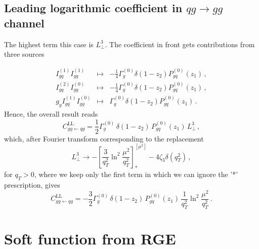 \documentclass[a4paper,11pt]{report}
\numberwithin{equation}{section}
\newcommand{\Lp}{L_\perp}
\begin{document}
\subsection{Leading logarithmic coefficient in $qg \to gg$ channel}

The highest term this case is $\Lp^3$. The coefficient in front gets
contributions from three sources
%

\begin{displaymath}
  \begin{array}{ccc}
    I^{(1)}_{gq} I^{(1)}_{gg} & \mapsto & 
    -\frac{1}{4} \Gamma^{(0)}_g \delta(1-z_2) P^{(0)}_{gq}(z_1)\,, \\[1em]
    I^{(2)}_{gq} I^{(0)}_{gg} & \mapsto & 
    -\frac{1}{4} \Gamma^{(0)}_g \delta(1-z_2) P^{(0)}_{gq}(z_1)\,, \\[1em]
    g_g I^{(1)}_{gq}I^{(0)}_{gg}  & \mapsto & 
    \Gamma^{(0)}_g \delta(1-z_2) P^{(0)}_{gq}(z_1)\,.
  \end{array}
\end{displaymath}
%
Hence, the overall result reads
\begin{equation}
    C_{gg\gets qg}^\text{LL} = 
    \frac12 \Gamma^{(0)}_g\, \delta(1-z_2)\, P^{(0)}_{gq}(z_1)\, \Lp^3\,,
\end{equation}
%
which, after Fourier transform corresponding to the
replacement~\cite{Li:2013mia}
%
\begin{equation}
  \Lp^3 \to -\left[\frac{3}{q_T^2} \ln^2\frac{\mu^2}{q_T^2}\right]^{[\mu^2]}_*
  - 4\zeta_3\delta(q_T^2)\,,
\end{equation}
%
for $q_T>0$, where we keep only the first term in which we can ignore the
'*' prescription, gives
%
\begin{equation}
    C_{gg\gets qg}^\text{LL} = 
    -\frac{3}{2} \Gamma^{(0)}_g\, \delta(1-z_2)\, P^{(0)}_{gq}(z_1)\,
    \frac{1}{q_T^2} \ln^2\frac{\mu^2}{q_T^2}\,.
\end{equation}
  



\newpage
\section{Soft function from RGE}

\end{document}
